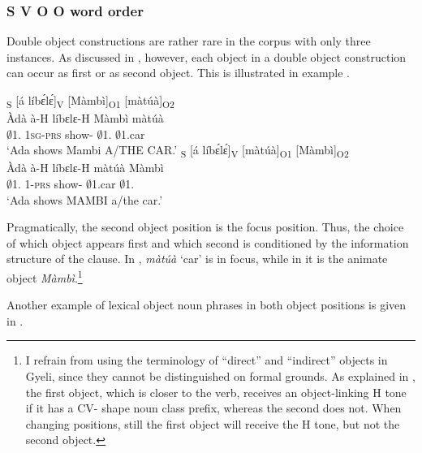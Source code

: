 \subsubsection{S V O O word order}
\label{sec:SVOO}

Double object constructions are rather rare in the corpus with only three instances. As discussed in , however, each object in a double object construction can occur as first or as second object. This is illustrated in example .

\ea\label{SVOO1}
\ea \label{SVOO1a}
  \glll  [Àdà]\textsubscript{S} [á líbɛ́lɛ́]\textsubscript{V} [Màmbì]\textsubscript{O1} [màtúà]\textsubscript{O2} \\
         {\db}Àdà {\db}à-H líbɛlɛ-H {\db}Màmbì {\db}màtúà \\
        {\db}$\emptyset$1.{\PN} {\db}1\textsc{sg}-\textsc{prs} show-{\R} {\db}$\emptyset$1.{\PN} {\db}$\emptyset$1.car\\
    \trans `Ada shows Mambi A/THE CAR.'
\ex\label{SVOO1b}
  \glll  [Àdà]\textsubscript{S} [á líbɛ́lɛ́]\textsubscript{V} [màtúà]\textsubscript{O1} [Màmbì]\textsubscript{O2} \\
         {\db}Àdà {\db}à-H líbɛlɛ-H {\db}màtúà {\db}Màmbì  \\
       {\db}$\emptyset$1.{\PN} {\db}1-\textsc{prs} show-{\R} {\db}$\emptyset$1.car {\db}$\emptyset$1.{\PN}    \\
    \trans `Ada shows MAMBI a/the car.'
\z
\z

\noindent Pragmatically, the second object position is the focus position. Thus, the choice of which object appears first and which second is conditioned by the information structure of the clause. In , {\itshape màtúà} `car' is in focus, while in  it is the animate object {\itshape Màmbì}.\footnote{I refrain from using the terminology of ``direct'' and ``indirect'' objects in Gyeli, since they cannot be distinguished on formal grounds. As explained in , the first object, which is closer to the verb, receives an object-linking H tone if it has a CV- shape noun class prefix, whereas the second does not. When changing positions, still the first object will receive the H tone, but not the second object.}

Another example of lexical object noun phrases in both object positions is given in .  

